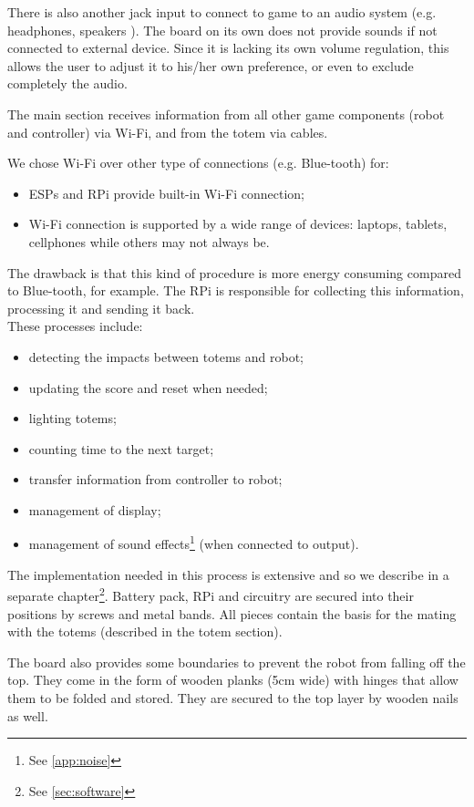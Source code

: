 \documentclass[a4paper,twoside]{book}
\begin{document}
There is also another jack input to connect to game to an audio system (e.g. headphones, speakers \textellipsis). The board on its own does not provide sounds if not connected to external device. Since it is lacking its own volume regulation, this allows the user to adjust it to his/her own preference, or even to exclude completely the audio.

The main section receives information from all other game components (robot and controller) via Wi-Fi, and from the totem via cables.

We chose Wi-Fi over other type of connections (e.g. Blue-tooth) for:
\begin{itemize}
\item ESPs and RPi provide built-in Wi-Fi connection;
\item Wi-Fi connection is supported by a wide range of devices: laptops, tablets, cellphones \textellipsis while others may not always be. 
\end{itemize}
The drawback is that this kind of procedure is more energy consuming compared to Blue-tooth, for example.
The RPi is responsible for collecting this information, processing it and sending it back.
\\
These processes include:
\begin{itemize}
\item detecting the impacts between totems and robot;
\item updating the score and reset when needed;
\item lighting totems;
\item counting time to the next target;
\item transfer information from controller to robot;
\item management of display;
\item management of sound effects\footnote {See \autoref{app:noise}} (when connected to output).

\end{itemize}
The implementation needed in this process is extensive and so we describe in a separate chapter\footnote{ See \autoref{sec:software}}.
Battery pack, RPi and circuitry are secured into their positions by screws and metal bands. All pieces contain the basis for the mating with the totems (described in the totem section).

The board also provides some boundaries to prevent the robot from falling off the top. They come in the form of wooden planks (5cm wide) with hinges that allow them to be folded and stored. They are secured to the top layer by wooden nails as well.
\end{document}
